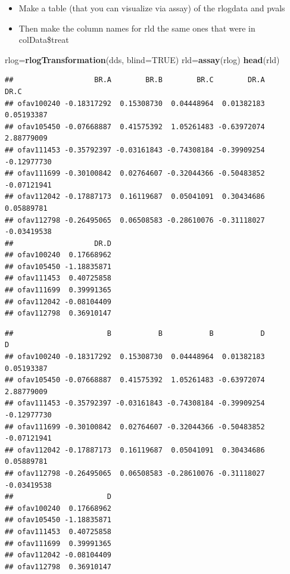 \documentclass[
]{article}
\newenvironment{Shaded}{\begin{snugshade}}{\end{snugshade}}
\newcommand{\DataTypeTok}[1]{\textcolor[rgb]{0.13,0.29,0.53}{#1}}
\newcommand{\KeywordTok}[1]{\textcolor[rgb]{0.13,0.29,0.53}{\textbf{#1}}}
\newcommand{\NormalTok}[1]{#1}
\newcommand{\OperatorTok}[1]{\textcolor[rgb]{0.81,0.36,0.00}{\textbf{#1}}}
\newcommand{\OtherTok}[1]{\textcolor[rgb]{0.56,0.35,0.01}{#1}}
\providecommand{\tightlist}{%
  \setlength{\itemsep}{0pt}\setlength{\parskip}{0pt}}
\begin{document}
\begin{itemize}
\tightlist
\item
  Make a table (that you can visualize via assay) of the rlogdata and
  pvals
\item
  Then make the column names for rld the same ones that were in
  colData\$treat
\end{itemize}

\begin{Shaded}
\begin{Highlighting}[]
\NormalTok{rlog=}\KeywordTok{rlogTransformation}\NormalTok{(dds, }\DataTypeTok{blind=}\OtherTok{TRUE}\NormalTok{) }
\NormalTok{rld=}\KeywordTok{assay}\NormalTok{(rlog)}
\KeywordTok{head}\NormalTok{(rld)}
\end{Highlighting}
\end{Shaded}

\begin{verbatim}
##                   BR.A        BR.B        BR.C        DR.A        DR.C
## ofav100240 -0.18317292  0.15308730  0.04448964  0.01382183  0.05193387
## ofav105450 -0.07668887  0.41575392  1.05261483 -0.63972074  2.88779009
## ofav111453 -0.35792397 -0.03161843 -0.74308184 -0.39909254 -0.12977730
## ofav111699 -0.30100842  0.02764607 -0.32044366 -0.50483852 -0.07121941
## ofav112042 -0.17887173  0.16119687  0.05041091  0.30434686  0.05889781
## ofav112798 -0.26495065  0.06508583 -0.28610076 -0.31118027 -0.03419538
##                   DR.D
## ofav100240  0.17668962
## ofav105450 -1.18835871
## ofav111453  0.40725858
## ofav111699  0.39991365
## ofav112042 -0.08104409
## ofav112798  0.36910147
\end{verbatim}

\begin{Shaded}
\end{Shaded}

\begin{verbatim}
##                      B           B           B           D           D
## ofav100240 -0.18317292  0.15308730  0.04448964  0.01382183  0.05193387
## ofav105450 -0.07668887  0.41575392  1.05261483 -0.63972074  2.88779009
## ofav111453 -0.35792397 -0.03161843 -0.74308184 -0.39909254 -0.12977730
## ofav111699 -0.30100842  0.02764607 -0.32044366 -0.50483852 -0.07121941
## ofav112042 -0.17887173  0.16119687  0.05041091  0.30434686  0.05889781
## ofav112798 -0.26495065  0.06508583 -0.28610076 -0.31118027 -0.03419538
##                      D
## ofav100240  0.17668962
## ofav105450 -1.18835871
## ofav111453  0.40725858
## ofav111699  0.39991365
## ofav112042 -0.08104409
## ofav112798  0.36910147
\end{verbatim}
\end{document}
